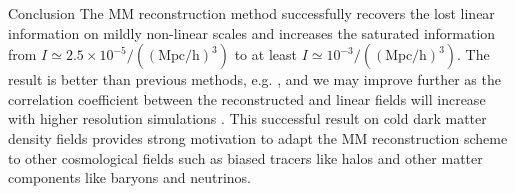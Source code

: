 \begin{section}{Conclusion}
  \label{sec:conclusion}
  The MM reconstruction method successfully recovers the lost linear
  information on mildly non-linear scales and increases the saturated
  information from $I \simeq 2.5 \times 10^{-5}/(\mathrm{(Mpc/h)}^3)$
  to at least $I \simeq 10^{-3}/(\mathrm{(Mpc/h)}^3)$.  The result is
  better than previous methods,
  e.g. \cite{bib:Mark2006,bib:Mark2009,bib:Zhang2011,bib:Yu2012}, and
  we may improve further as the correlation coefficient between the
  reconstructed and linear fields will increase with higher resolution
  simulations \cite{bib:ZhuH2016}.  This successful result on cold
  dark matter density fields provides strong motivation to adapt the
  MM reconstruction scheme to other cosmological fields such as biased
  tracers like halos and other matter components like baryons and
  neutrinos.



\end{section}
